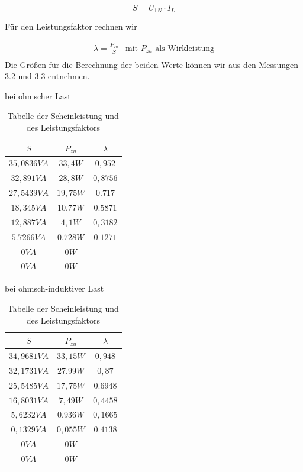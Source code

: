 \documentclass{article}
\begin{document}
$$S = U_{1N}\cdot I_{L}$$

Für den Leistungsfaktor rechnen wir

\[
  \begin{array}{ll}
    \lambda = \frac{P_{zu}}{S} & \text{mit $P_{zu}$ als Wirkleistung}\\
  \end{array}
\]
Die Größen für die Berechnung der beiden Werte können wir aus den Messungen 3.2 und 3.3 entnehmen.

\begin{table}[h]
  \centering
  \begin{subtable}{.45\linewidth}
    \centering
    \caption{bei ohmscher Last}
    \begin{tabular}{|c|c|c|}
      \hline
      $S$ & $P_{zu}$ & $\lambda$ \\
      \hline
      $35,0836VA$ & $33,4W$ & $0,952$\\
      \hline
      $32,891VA$ & $28,8W$ & $0,8756$\\
      \hline
      $27,5439VA$ & $19,75W$ & $0.717$\\
      \hline
      $18,345VA$ & $10.77W$ & $0.5871$\\
      \hline
      $12,887VA$ & $4,1W$ & $0,3182$\\
      \hline
      $5.7266VA$ & $0.728W$ & $0.1271$\\
      \hline
      $0VA$ & $0W$ & $-$\\
      \hline
      $0VA$ & $0W$ & $-$\\
      \hline
    \end{tabular}
  \end{subtable}
  \begin{subtable}{.45\linewidth}
    \centering
    \caption{bei ohmsch-induktiver Last}
    \begin{tabular}{|c|c|c|}
      \hline
      $S$ & $P_{zu}$ & $\lambda$ \\
      \hline
      $34,9681VA$ & $33,15W$ & $0,948$\\
      \hline
      $32,1731VA$ & $27.99W$ & $0,87$\\
      \hline
      $25,5485VA$ & $17,75W$ & $0.6948$\\
      \hline
      $16,8031VA$ & $7,49W$ & $0,4458$\\
      \hline
      $5,6232VA$ & $0.936W$ & $0,1665$\\
      \hline
      $0,1329VA$ & $0,055W$ & $0.4138$\\
      \hline
      $0VA$ & $0W$ & $-$\\
      \hline
      $0VA$ & $0W$ & $-$\\
      \hline
    \end{tabular}
  \end{subtable}
  \caption{Tabelle der Scheinleistung und des Leistungsfaktors}
  \label{tab:scheinfak}
\end{table}
\end{document}
